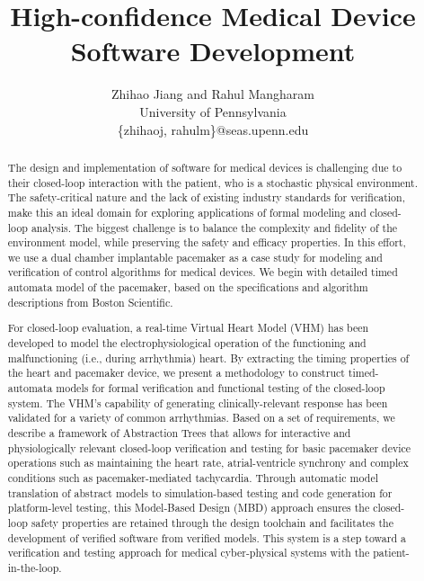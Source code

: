 \documentclass[openany]{now} %
\title{High-confidence Medical Device Software Development}
\author{
Zhihao Jiang and Rahul Mangharam \\
University of Pennsylvania\\
\{zhihaoj, rahulm\}@seas.upenn.edu
}
\begin{document}

\frontmatter  %

\maketitle

\tableofcontents

\mainmatter

\begin{abstract}
The design and implementation of software for medical devices is challenging due to their closed-loop interaction with the patient, who is a stochastic physical environment. The safety-critical nature and the lack of existing industry standards for verification, make this an ideal domain for exploring applications of formal modeling and closed-loop analysis. The biggest challenge is to balance the complexity and fidelity of the environment model, while preserving the safety and efficacy properties. In this effort, we use a dual chamber implantable pacemaker as a case study for modeling and verification of control algorithms for medical devices. We begin with detailed timed automata model of the pacemaker, based on the specifications and algorithm descriptions from Boston Scientific. 

For closed-loop evaluation, a real-time Virtual Heart Model (VHM) has been developed to model the electrophysiological operation of the functioning and malfunctioning (i.e., during arrhythmia) heart. By extracting the timing properties of the heart and pacemaker device, we present a methodology to construct timed-automata models for formal verification and functional testing of the closed-loop system. The VHM's capability of generating clinically-relevant response has been validated for a variety of common arrhythmias. Based on a set of requirements, we describe a framework of Abstraction Trees that allows for interactive and physiologically relevant closed-loop verification and testing
 for basic pacemaker device operations such as maintaining the heart rate, atrial-ventricle synchrony and complex conditions such as pacemaker-mediated tachycardia. Through automatic model translation of abstract models to simulation-based testing and code generation for platform-level testing, this Model-Based Design (MBD) approach ensures the closed-loop safety properties are retained through the design toolchain and facilitates the development of verified software from verified models.
 This system is a step toward a verification and testing approach for medical cyber-physical systems with the patient-in-the-loop.

\end{abstract}







%






\backmatter







\end{document}
